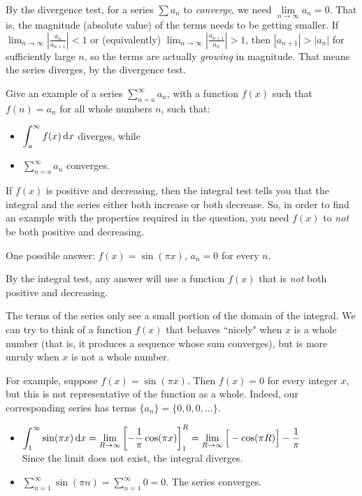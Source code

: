 \begin{solution}
By the divergence test, for a series $\sum a_n$ to \emph{converge}, we need $\lim\limits_{n \to \infty} a_n=0$. That is, the magnitude (absolute value) of the terms needs to be getting smaller. If $\displaystyle\lim_{n \to \infty}\left|\frac{a_n}{a_{n+1}}\right|<1$ or (equivalently) $\displaystyle \lim_{n \to \infty}\left|\frac{a_{n+1}}{a_{n}}\right|>1$, then $|a_{n+1}|>|a_n|$ for sufficiently large $n$, so the terms are actually \emph{growing} in magnitude. That means the series diverges, by the divergence test.
\end{solution}

\begin{question}
Give an example of a series $\displaystyle\sum_{n=a}^\infty a_n$, with a function $f(x)$ such that $f(n)=a_n$ for all whole numbers $n$, such that:
\begin{itemize}
\item $\displaystyle\int_a^\infty f(x)\,\mathrm{d}x$ diverges, while
\item $\displaystyle\sum_{n=a}^\infty a_n$ converges.
\end{itemize}
\end{question}
\begin{hint}
If $f(x)$ is positive and decreasing, then the integral test tells you that the integral and the series either both increase or both decrease. So, in order to find an example with the properties required in the question, you need $f(x)$ to \emph{not} be both positive and decreasing.
\end{hint}
\begin{answer}
One possible answer: $f(x) = \sin(\pi x)$, $a_n=0$ for every $n$.

By the integral test, any answer will use a function $f(x)$  that is \emph{not} both positive and decreasing.
\end{answer}
\begin{solution}
The terms of the series only see a small portion of the domain of the integral. We can try to think of a function $f(x)$ that behaves ``nicely" when $x$ is a whole number (that is, it produces a sequence whose sum converges), but is more unruly when $x$ is not a whole number.

For example, suppose $f(x)=\sin(\pi x)$. Then $f(x)=0$ for every integer $x$, but this is not representative of the function as a whole. Indeed, our corresponding series has terms $\{a_n\}=\{0,0,0,\ldots\}$.
\begin{itemize}
\item $\displaystyle\int_{1}^\infty \sin(\pi x)\,\mathrm{d}x = \lim_{R \to \infty} \left[-\frac{1}{\pi}\cos (\pi x)\right]_1^R = \lim_{R \to \infty}\Big[-\cos (\pi R)\Big]-\frac{1}{\pi}$\\
 Since the limit does not exist, the integral diverges.
 \item $\displaystyle\sum_{n=1}^{\infty}\sin(\pi n) = \sum_{n=1}^\infty 0 = 0$. The series converges.
\end{itemize}\end{solution}

